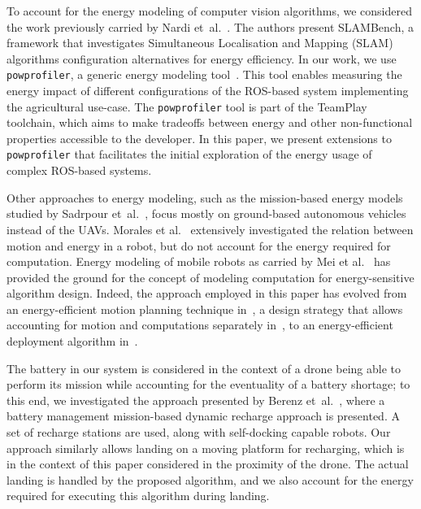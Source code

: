 \documentclass[conference]{IEEEtran}
\newcommand{\stt}[1]{{\small\tt #1}} %
\newcommand{\powprof}{\stt{powprofiler}}
\begin{document}
To account for the energy modeling of computer vision algorithms, we
considered the work previously carried by Nardi
et~al.~\cite{nardi2015introducing}. The authors present SLAMBench, a
framework that investigates Simultaneous Localisation and Mapping (SLAM) algorithms configuration alternatives
for energy efficiency. In our work, we use \powprof{}, a generic energy
modeling tool~\cite{seewald2019coarse}. This tool enables measuring
the energy impact of different configurations of the ROS-based system
implementing the agricultural use-case.
The \powprof{} tool is part of the TeamPlay toolchain, which aims to make tradeoffs between energy and other non-functional properties accessible to the developer. 
In this paper, we present
extensions to \powprof{} that facilitates the initial exploration of
the energy usage of complex ROS-based systems.

Other approaches to energy modeling, such as the mission-based energy
models studied by Sadrpour et~al.~\cite{sadrpour2013experimental,
  sadrpour2013mission}, focus mostly on ground-based autonomous
vehicles instead of the UAVs. Morales et al.~\cite{morales2009power}
extensively investigated the relation between motion and energy in a
robot, but do not account for the energy required for computation.
%
Energy modeling of mobile robots as carried by Mei et
al.~\cite{mei2006deployment, mei2005case, mei2004energy} has provided
the ground for the concept of modeling computation for
energy-sensitive algorithm design. Indeed, the approach employed in this paper has evolved
from an energy-efficient motion planning technique
in~\cite{mei2004energy}, a design strategy that allows accounting for
motion and computations separately in~\cite{mei2005case}, to an
energy-efficient deployment algorithm in~\cite{mei2006deployment}.

The battery in our system is considered in the context of a drone
being able to perform its mission while accounting for the eventuality
of a battery shortage; to this end, we investigated the approach
presented by Berenz et~al.~\cite{berenz2012autonomous}, where a
battery management mission-based dynamic recharge approach is
presented. A set of recharge stations are used, along with
self-docking capable robots. Our approach similarly allows landing on
a moving platform for recharging, which is in the context of this
paper considered in the proximity of the drone. The actual landing
is handled by the proposed algorithm, and we also account for the
energy required for executing this algorithm during landing.
\end{document}

